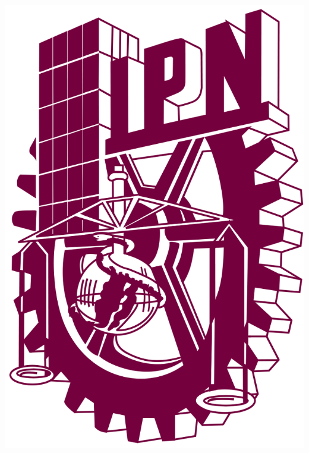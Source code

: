 \begin{titlepage}
    \centering
    \begin{adjustbox}{max width=1.2\linewidth, right}
        \begin{minipage}[c][0.99\textheight][t]{0.13\textwidth}
            \centering
            \includegraphics[width=\linewidth]{img/logo-ipn.png} \\
            \vspace{5mm}
            \hskip3pt
            {\color{red_cic} \vrule width1.5pt height0.75\textheight} 
            \hskip5pt
            {\color{black_cic} \vrule width2.5pt height0.75\textheight} 
            \hskip3pt
            {\color{yellow_cic} \vrule width1.5pt height0.75\textheight} \\
            \vspace{5mm}

\end{minipage}
\end{adjustbox}
\end{titlepage}
